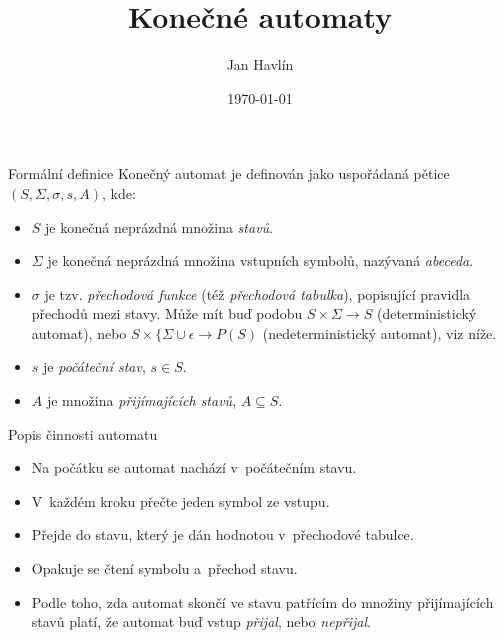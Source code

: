 \documentclass{beamer}
\title{Konečné automaty}
\author{Jan Havlín}
\institute
{Fakulta informačních technologií\\
Vysoké učení technické v~Brně}
\date{\today}
\begin{document}
\begin{frame}
  \titlepage
\end{frame}

\begin{frame}{Formální definice}
Konečný automat je definován jako uspořádaná pětice $\left(S, \Sigma, \sigma, s, A \right)$, kde:
\begin{itemize}
	\item{$S$ je konečná neprázdná množina \emph{stavů}.}
	\item{$\Sigma$ je konečná neprázdná množina vstupních symbolů, nazývaná \emph{abeceda}.}
	\item{$\sigma$ je tzv. \emph{přechodová funkce} (též \emph{přechodová tabulka}), popisující pravidla přechodů mezi stavy. Může mít buď podobu $S \times \Sigma \rightarrow S$ (deterministický automat), nebo $S \times \{\Sigma \cup \epsilon \rightarrow P(S)$ (nedeterministický automat), viz níže.}
	\item{$s$ je \emph{počáteční stav}, $s \in S$.}
	\item{$A$ je množina \emph{přijímajících stavů}, $A \subseteq S$.}
\end{itemize}
\end{frame}


\begin{frame}{Popis činnosti automatu}
\begin{itemize}
	\item{Na počátku se automat nachází v~počátečním stavu.}
	\item{V~každém kroku přečte jeden symbol ze vstupu.}
	\item{Přejde do stavu, který je dán hodnotou v~přechodové tabulce.}
	\item{Opakuje se čtení symbolu a~přechod stavu.}
	\item{Podle toho, zda automat skončí ve stavu patřícím do množiny přijímajících stavů platí, že automat buď vstup \emph{přijal}, nebo \emph{nepřijal}.}
\end{itemize}
\end{frame}
\end{document}
